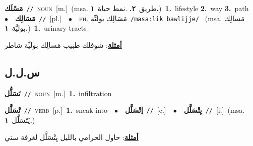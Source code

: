 \documentclass[10pt,a4paper,twoside]{article} %
\begin{document}
\begin{multicols}{2}
{\setlength\topsep{0pt}\textbf{\foreignlanguage{arabic}{مَسْلَك}}\ {\color{gray}\texttt{//}\color{black}}\ \textsc{noun}\ [m.]\ \color{gray}(msa. \foreignlanguage{arabic}{طريق}~\foreignlanguage{arabic}{\textbf{٢.}}  .\foreignlanguage{arabic}{نمط حياة}~\foreignlanguage{arabic}{\textbf{١.}})\color{black}\ \textbf{1.}~lifestyle  \textbf{2.}~way  \textbf{3.}~path\ \ $\bullet$\ \ \setlength\topsep{0pt}\textbf{\foreignlanguage{arabic}{مَسَالِك}}\ {\color{gray}\texttt{//}\color{black}}\ [pl.]\ \ $\bullet$\ \ \textsc{ph.} \color{gray} \foreignlanguage{arabic}{مَسَالِك بوليِّة}\color{black}\ {\color{gray}\texttt{/{\sffamily masaːlik bawlijje}/}\color{black}}\ \color{gray} (msa. \foreignlanguage{arabic}{مَسالِك بوليَّة}~\foreignlanguage{arabic}{\textbf{١.}})\color{black}\ \textbf{1.}~urinary tracts\  \begin{flushright}\color{gray}\foreignlanguage{arabic}{\textbf{\underline{\foreignlanguage{arabic}{أمثلة}}}: شوفلك طبيب مَسالِك بوليِّة شاطر}\end{flushright}\color{black}} \vspace{2mm}

\vspace{-3mm}
\subsection*{\color{blue}\foreignlanguage{arabic}{س.ل.ل}\color{blue}{}} 

{\setlength\topsep{0pt}\textbf{\foreignlanguage{arabic}{تَسَلُّل}}\ {\color{gray}\texttt{//}\color{black}}\ \textsc{noun}\ [m.]\ \textbf{1.}~infiltration\ } \vspace{2mm}

{\setlength\topsep{0pt}\textbf{\foreignlanguage{arabic}{تْسَلَّل}}\ {\color{gray}\texttt{//}\color{black}}\ \textsc{verb}\ [p.]\ \textbf{1.}~sneak into\ \ $\bullet$\ \ \setlength\topsep{0pt}\textbf{\foreignlanguage{arabic}{اِتْسَلَّل}}\ {\color{gray}\texttt{//}\color{black}}\ [c.]\ \ $\bullet$\ \ \setlength\topsep{0pt}\textbf{\foreignlanguage{arabic}{يِتْسَلَّل}}\ {\color{gray}\texttt{//}\color{black}}\ [i.]\ \color{gray}(msa. \foreignlanguage{arabic}{يَتَسَلَّل}~\foreignlanguage{arabic}{\textbf{١.}})\color{black}\  \begin{flushright}\color{gray}\foreignlanguage{arabic}{\textbf{\underline{\foreignlanguage{arabic}{أمثلة}}}: حاول الحرامي بالليل يِتْسَلَّل لغرفة ستي}\end{flushright}\color{black}} \vspace{2mm}


\end{multicols}
\end{document}
